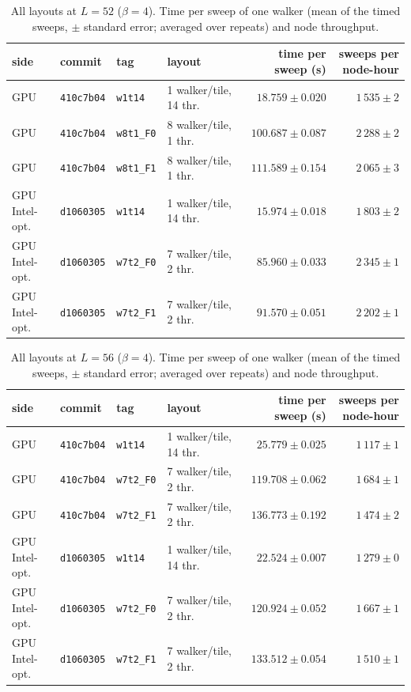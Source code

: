 \begin{table}[h]\centering\small
\caption{All layouts at $L=52$ ($\beta=4$). Time per sweep of one walker (mean of the timed sweeps, $\pm$ standard error; averaged over repeats) and node throughput.}
\begin{tabular}{@{}llllrr@{}}\toprule
side & commit & tag & layout & time per sweep (s) & sweeps per node-hour\\\midrule
GPU & \texttt{410c7b04} & \texttt{w1t14} & 1 walker/tile, 14 thr. & $18.759 \pm 0.020$ & $1\,535 \pm 2$\\
GPU & \texttt{410c7b04} & \texttt{w8t1\_F0} & 8 walker/tile, 1 thr. & $100.687 \pm 0.087$ & $2\,288 \pm 2$\\
GPU & \texttt{410c7b04} & \texttt{w8t1\_F1} & 8 walker/tile, 1 thr. & $111.589 \pm 0.154$ & $2\,065 \pm 3$\\
GPU Intel-opt. & \texttt{d1060305} & \texttt{w1t14} & 1 walker/tile, 14 thr. & $15.974 \pm 0.018$ & $1\,803 \pm 2$\\
GPU Intel-opt. & \texttt{d1060305} & \texttt{w7t2\_F0} & 7 walker/tile, 2 thr. & $85.960 \pm 0.033$ & $2\,345 \pm 1$\\
GPU Intel-opt. & \texttt{d1060305} & \texttt{w7t2\_F1} & 7 walker/tile, 2 thr. & $91.570 \pm 0.051$ & $2\,202 \pm 1$\\
\bottomrule\end{tabular}\end{table}
\begin{table}[h]\centering\small
\caption{All layouts at $L=56$ ($\beta=4$). Time per sweep of one walker (mean of the timed sweeps, $\pm$ standard error; averaged over repeats) and node throughput.}
\begin{tabular}{@{}llllrr@{}}\toprule
side & commit & tag & layout & time per sweep (s) & sweeps per node-hour\\\midrule
GPU & \texttt{410c7b04} & \texttt{w1t14} & 1 walker/tile, 14 thr. & $25.779 \pm 0.025$ & $1\,117 \pm 1$\\
GPU & \texttt{410c7b04} & \texttt{w7t2\_F0} & 7 walker/tile, 2 thr. & $119.708 \pm 0.062$ & $1\,684 \pm 1$\\
GPU & \texttt{410c7b04} & \texttt{w7t2\_F1} & 7 walker/tile, 2 thr. & $136.773 \pm 0.192$ & $1\,474 \pm 2$\\
GPU Intel-opt. & \texttt{d1060305} & \texttt{w1t14} & 1 walker/tile, 14 thr. & $22.524 \pm 0.007$ & $1\,279 \pm 0$\\
GPU Intel-opt. & \texttt{d1060305} & \texttt{w7t2\_F0} & 7 walker/tile, 2 thr. & $120.924 \pm 0.052$ & $1\,667 \pm 1$\\
GPU Intel-opt. & \texttt{d1060305} & \texttt{w7t2\_F1} & 7 walker/tile, 2 thr. & $133.512 \pm 0.054$ & $1\,510 \pm 1$\\
\bottomrule\end{tabular}\end{table}

